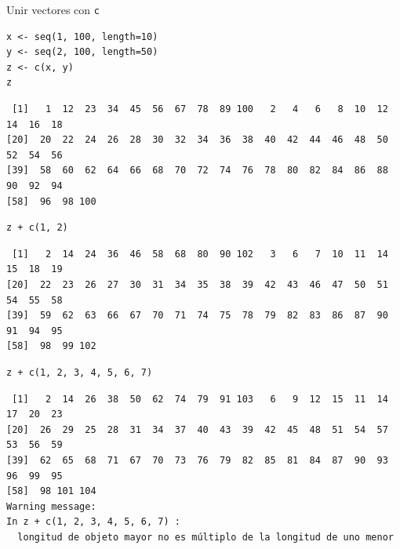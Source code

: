 \documentclass[xcolor={usenames,svgnames,dvipsnames}]{beamer}
\begin{document}
\begin{frame}[fragile,label=sec-2-1-5]{Unir vectores con \texttt{c}}
 \lstset{language=R,label= ,caption= ,numbers=none}
\begin{lstlisting}
x <- seq(1, 100, length=10)
y <- seq(2, 100, length=50)
z <- c(x, y)
z
\end{lstlisting}

\begin{verbatim}
 [1]   1  12  23  34  45  56  67  78  89 100   2   4   6   8  10  12  14  16  18
[20]  20  22  24  26  28  30  32  34  36  38  40  42  44  46  48  50  52  54  56
[39]  58  60  62  64  66  68  70  72  74  76  78  80  82  84  86  88  90  92  94
[58]  96  98 100
\end{verbatim}

\lstset{language=R,label= ,caption= ,numbers=none}
\begin{lstlisting}
z + c(1, 2)
\end{lstlisting}

\begin{verbatim}
 [1]   2  14  24  36  46  58  68  80  90 102   3   6   7  10  11  14  15  18  19
[20]  22  23  26  27  30  31  34  35  38  39  42  43  46  47  50  51  54  55  58
[39]  59  62  63  66  67  70  71  74  75  78  79  82  83  86  87  90  91  94  95
[58]  98  99 102
\end{verbatim}

\lstset{language=R,label= ,caption= ,numbers=none}
\begin{lstlisting}
z + c(1, 2, 3, 4, 5, 6, 7)
\end{lstlisting}

\begin{verbatim}
 [1]   2  14  26  38  50  62  74  79  91 103   6   9  12  15  11  14  17  20  23
[20]  26  29  25  28  31  34  37  40  43  39  42  45  48  51  54  57  53  56  59
[39]  62  65  68  71  67  70  73  76  79  82  85  81  84  87  90  93  96  99  95
[58]  98 101 104
Warning message:
In z + c(1, 2, 3, 4, 5, 6, 7) :
  longitud de objeto mayor no es múltiplo de la longitud de uno menor
\end{verbatim}
\end{frame}
\end{document}
